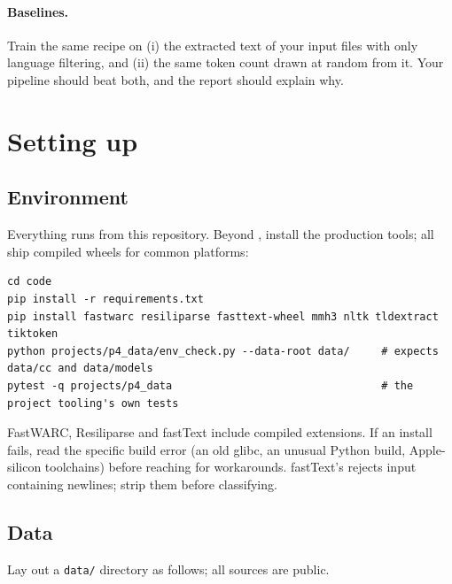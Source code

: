 \paragraph{Baselines.} Train the same recipe on (i) the extracted text of your input files with only
language filtering, and (ii) the same token count drawn at random from it. Your pipeline should beat both,
and the report should explain why.

\section{Setting up}\label{sec:proj4:setup}

\subsection{Environment}

Everything runs from this repository. Beyond , install the production
tools; all ship compiled wheels for common platforms:

\begin{lstlisting}[style=shell]
cd code
pip install -r requirements.txt
pip install fastwarc resiliparse fasttext-wheel mmh3 nltk tldextract tiktoken
python projects/p4_data/env_check.py --data-root data/     # expects data/cc and data/models
pytest -q projects/p4_data                                 # the project tooling's own tests
\end{lstlisting}

\begin{pitfall}
FastWARC, Resiliparse and fastText include compiled extensions. If an install fails, read the
specific build error (an old glibc, an unusual Python build, Apple-silicon toolchains) before
reaching for workarounds. fastText's  rejects input containing newlines; strip
them before classifying.
\end{pitfall}

\subsection{Data}

Lay out a \texttt{data/} directory as follows; all sources are public.

